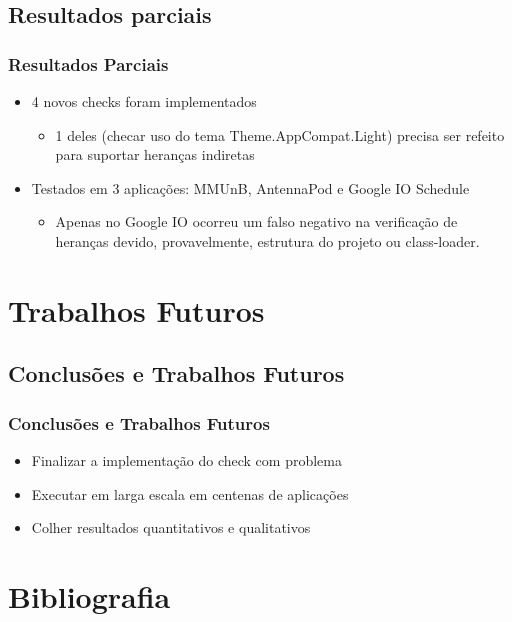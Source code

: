 \documentclass{beamer}
\begin{document}
    \subsection{Resultados parciais}
    \frame
    {
        \frametitle{Resultados Parciais}
        \begin{itemize}
            \item 4 novos checks foram implementados
            \begin{itemize}
                \item 1 deles (checar uso do tema Theme.AppCompat.Light) precisa
                ser refeito para suportar heranças indiretas
            \end{itemize}
            \item{Testados em 3 aplicações: MMUnB, AntennaPod e Google IO Schedule}
                \begin{itemize}
                    \item Apenas no Google IO ocorreu um falso negativo na verificação
                    de heranças devido, provavelmente, estrutura do projeto ou class-loader.
                \end{itemize}
        \end{itemize}
    }

\section{Trabalhos Futuros}
    \subsection{Conclusões e Trabalhos Futuros}
    \frame
    {
        \frametitle{Conclusões e Trabalhos Futuros}
        \begin{itemize}
            \item Finalizar a implementação do check com problema
            \item Executar em larga escala em centenas de aplicações
            \item Colher resultados quantitativos e qualitativos
        \end{itemize}
    }

\section{Bibliografia}
\end{document}
